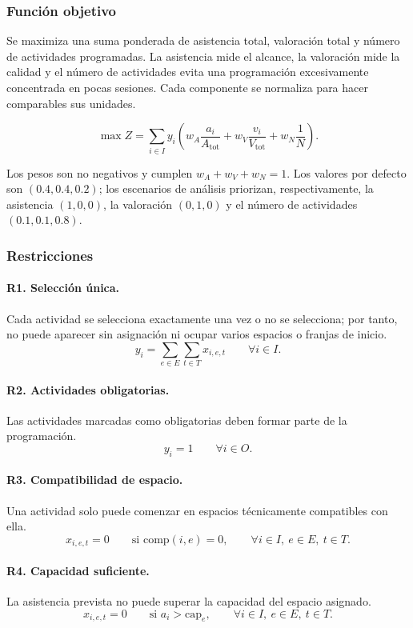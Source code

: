 \subsubsection{Función objetivo}
Se maximiza una suma ponderada de asistencia total, valoración total y número
de actividades programadas. La asistencia mide el alcance, la valoración mide
la calidad y el número de actividades evita una programación excesivamente
concentrada en pocas sesiones. Cada componente se normaliza para hacer
comparables sus unidades.

\[
\max Z=
\sum_{i\in I}y_i
\left(
w_A\frac{a_i}{A_{\mathrm{tot}}}
+
w_V\frac{v_i}{V_{\mathrm{tot}}}
+
w_N\frac{1}{N}
\right).
\]

Los pesos son no negativos y cumplen
$w_A+w_V+w_N=1$. Los valores por defecto son $(0.4,0.4,0.2)$; los escenarios
de análisis priorizan, respectivamente, la asistencia $(1,0,0)$, la valoración
$(0,1,0)$ y el número de actividades $(0.1,0.1,0.8)$.

\subsubsection{Restricciones}

\paragraph{R1. Selección única.}
Cada actividad se selecciona exactamente una vez o no se selecciona; por tanto,
no puede aparecer sin asignación ni ocupar varios espacios o franjas de inicio.
\[
y_i=\sum_{e\in E}\sum_{t\in T}x_{i,e,t}
\qquad\forall i\in I.
\]

\paragraph{R2. Actividades obligatorias.}
Las actividades marcadas como obligatorias deben formar parte de la
programación.
\[
y_i=1\qquad\forall i\in O.
\]

\paragraph{R3. Compatibilidad de espacio.}
Una actividad solo puede comenzar en espacios técnicamente compatibles con ella.
\[
x_{i,e,t}=0\qquad
\text{si }\mathrm{comp}(i,e)=0,
\qquad\forall i\in I,\ e\in E,\ t\in T.
\]

\paragraph{R4. Capacidad suficiente.}
La asistencia prevista no puede superar la capacidad del espacio asignado.
\[
x_{i,e,t}=0\qquad
\text{si }a_i>\mathrm{cap}_e,
\qquad\forall i\in I,\ e\in E,\ t\in T.
\]

